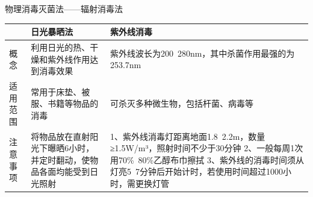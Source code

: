 \documentclass[11pt, a4paper]{ctexart}
\begin{document}
\begin{tipsbox}{物理消毒灭菌法——辐射消毒法}
\begin{tabular}{|p{3cm}|p{5cm}|p{5cm}|}
\hline
 & \textbf{日光暴晒法} & \textbf{紫外线消毒} \\
\hline
概念 & 利用日光的热、干燥和紫外线作用达到消毒效果 & 紫外线波长为200~280nm，其中杀菌作用最强的为253.7nm \\
\hline
适用范围 & 常用于床垫、被服、书籍等物品的消毒 & 可杀灭多种微生物，包括杆菌、病毒等 \\
\hline
注意事项 & 将物品放在直射阳光下曝晒6小时，并定时翻动，使物品各面均能受到日光照射 & 1、紫外线消毒灯距离地面1.8~2.2m，数量≥1.5W/m³，照射时间不少于30分钟 2、一般每周1次用70\%~80\%乙醇布巾擦拭 3、紫外线的消毒时间须从灯亮5~7分钟后开始计时，若使用时间超过1000小时，需更换灯管 \\
\hline
\end{tabular}
\end{tipsbox}
\end{document}
